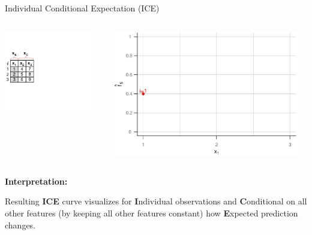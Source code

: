 \documentclass[11pt,compress,t,notes=noshow, aspectratio=169, xcolor=table]{beamer}
\begin{document}
\begin{frame}{Individual Conditional Expectation (ICE)}

\begin{columns}[T]
\begin{column}{0.4\textwidth}
\includegraphics[page=5, trim=0cm 0.35cm 0.85cm 0.35cm, width=0.9\textwidth]{figure_man/ice_plot_demo}
\end{column}
\begin{column}{0.55\textwidth}
\includegraphics[page=3, width=0.95\textwidth]{figure/ICE}
\end{column}
\end{columns}

\textbf{Interpretation:}

Resulting \textbf{ICE} curve visualizes for \textbf{I}ndividual observations and \textbf{C}onditional on all other features (by keeping all other features constant) how \textbf{E}xpected prediction changes.
\end{frame}
\end{document}

